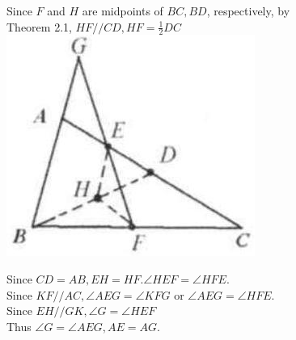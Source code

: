 \documentclass{article}
\begin{document}
Since \(F\) and \(H\) are midpoints of \(B C, B D\), respectively, by\\
Theorem 2.1, \(H F / / C D, H F=\frac{1}{2} D C\)\\
\centering
\includegraphics[width=\textwidth]{images/050(1).jpg}

Since \(C D=A B, E H=H F . \angle H E F=\angle H F E\).\\
Since \(K F / / A C, \angle A E G=\angle K F G\) or \(\angle A E G=\angle H F E\).\\
Since \(E H / / G K, \angle G=\angle H E F\)\\
Thus \(\angle G=\angle A E G, A E=A G\).
\end{document}
